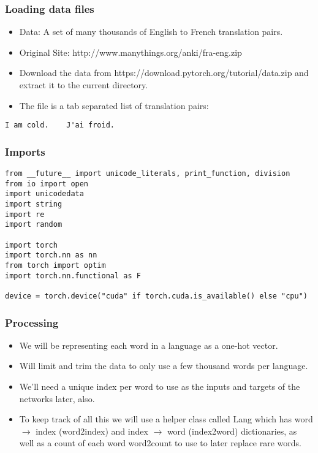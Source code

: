 \begin{frame}[fragile]
\frametitle{ Loading data files}
\begin{itemize}
\item Data: A set of many thousands of English to French translation pairs.
\item Original Site: http://www.manythings.org/anki/fra-eng.zip
\item Download the data from https://download.pytorch.org/tutorial/data.zip and extract it to the current directory.
\item The file is a tab separated list of translation pairs:
\end{itemize}
\begin{lstlisting}    
I am cold.    J'ai froid.
\end{lstlisting}         
\end{frame} 

\begin{frame}[fragile]
\frametitle{ Imports}
\begin{lstlisting}    
from __future__ import unicode_literals, print_function, division
from io import open
import unicodedata
import string
import re
import random

import torch
import torch.nn as nn
from torch import optim
import torch.nn.functional as F

device = torch.device("cuda" if torch.cuda.is_available() else "cpu")
\end{lstlisting}         
\end{frame} 
\begin{frame}[fragile]
\frametitle{Processing}
\begin{itemize}
\item We will be representing each word in a language as a one-hot vector.
\item Will limit and trim the data to only use a few thousand words per language.
\item We'll need a unique index per word to use as the inputs and targets of the networks later, also.
\item To keep track of all this we will use a helper class called Lang which has word $\rightarrow$ index (word2index) and index $\rightarrow$ word (index2word) dictionaries, as well as a count of each word word2count to use to later replace rare words.
\end{itemize}
   
\end{frame} 

